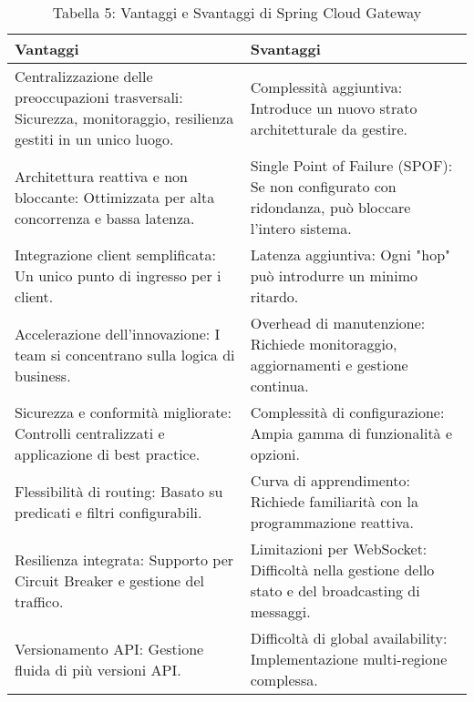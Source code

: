 \begin{table}[htbp]
\centering
\caption{Tabella 5: Vantaggi e Svantaggi di Spring Cloud Gateway}
\renewcommand{\arraystretch}{1.5}
\label{tab:vantaggi_svantaggi}
\begin{tabularx}{\linewidth}{%
    >{\RaggedRight\arraybackslash}X %
    >{\RaggedRight\arraybackslash}X %
}
\toprule
\textbf{Vantaggi} & \textbf{Svantaggi} \\
\midrule
Centralizzazione delle preoccupazioni trasversali: Sicurezza, monitoraggio, resilienza gestiti in un unico luogo. & Complessità aggiuntiva: Introduce un nuovo strato architetturale da gestire. \\
Architettura reattiva e non bloccante: Ottimizzata per alta concorrenza e bassa latenza. & Single Point of Failure (SPOF): Se non configurato con ridondanza, può bloccare l'intero sistema. \\
Integrazione client semplificata: Un unico punto di ingresso per i client. & Latenza aggiuntiva: Ogni "hop" può introdurre un minimo ritardo. \\
Accelerazione dell'innovazione: I team si concentrano sulla logica di business. & Overhead di manutenzione: Richiede monitoraggio, aggiornamenti e gestione continua. \\
Sicurezza e conformità migliorate: Controlli centralizzati e applicazione di best practice. & Complessità di configurazione: Ampia gamma di funzionalità e opzioni. \\
Flessibilità di routing: Basato su predicati e filtri configurabili. & Curva di apprendimento: Richiede familiarità con la programmazione reattiva. \\
Resilienza integrata: Supporto per Circuit Breaker e gestione del traffico. & Limitazioni per WebSocket: Difficoltà nella gestione dello stato e del broadcasting di messaggi. \\
Versionamento API: Gestione fluida di più versioni API. & Difficoltà di global availability: Implementazione multi-regione complessa. \\
\bottomrule
\end{tabularx}
\end{table}
